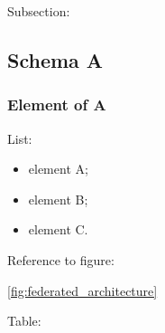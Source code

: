 Subsection:

\subsection{Schema A}

\subsubsection{Element of A}

List:

\begin{itemize}
  \setlength{\itemsep}{2pt}
  \setlength{\parskip}{2pt}
  \item element A;
  \item element B;
  \item element C.
\end{itemize}


Reference to figure:

\ref{fig:federated_architecture}

Table:

